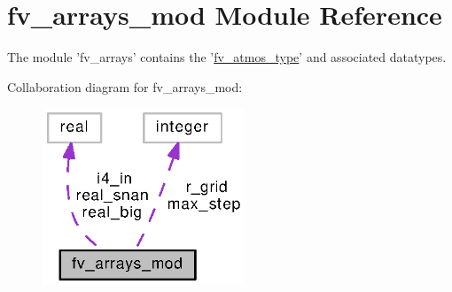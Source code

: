 \section{fv\-\_\-arrays\-\_\-mod Module Reference}
\label{classfv__arrays__mod}


The module 'fv\-\_\-arrays' contains the '\hyperlink{structfv__arrays__mod_1_1fv__atmos__type}{fv\-\_\-atmos\-\_\-type}' and associated datatypes.  




Collaboration diagram for fv\-\_\-arrays\-\_\-mod\-:
\nopagebreak
\begin{figure}[H]
\begin{center}
\leavevmode
\includegraphics[width=171pt]{classfv__arrays__mod__coll__graph}
\end{center}
\end{figure}

